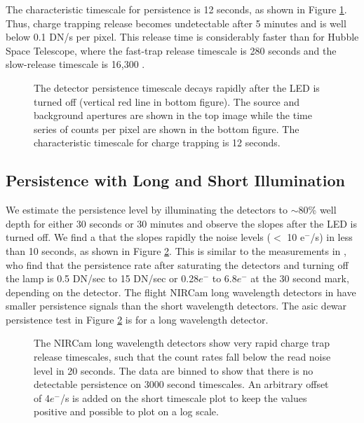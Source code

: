 \documentclass{aastex62}
\begin{document}
The characteristic timescale for persistence is 12 seconds, as shown in Figure \ref{fig:persistence}.
Thus, charge trapping release becomes undetectable after 5 minutes and is well below 0.1 DN/s per pixel.
This release time is considerably faster than for Hubble Space Telescope, where the fast-trap release timescale is 280 seconds and the slow-release timescale is 16,300 \citep{zhou2017chargeTrap}.


\begin{figure}
{}
{}
\caption{The detector persistence timescale decays rapidly after the LED is turned off (vertical red line in bottom figure).
The source and background apertures are shown in the top image while the time series of counts per pixel are shown in the bottom figure.
The characteristic timescale for charge trapping is 12 seconds.}\label{fig:persistence}
\end{figure}


\subsection{Persistence with Long and Short Illumination}
We estimate the persistence level by illuminating the detectors to $\sim$80\% well depth for either 30 seconds or 30 minutes and observe the slopes after the LED is turned off.
We find a that the slopes rapidly the noise levels ($<$ 10 e$^-$/s) in less than 10 seconds, as shown in Figure \ref{fig:persistenceAZlab04}.
This is similar to the measurements in \citet{leisenring2016persistence}, who find that the persistence rate after saturating the detectors and turning off the lamp is 0.5 DN/sec to 15 DN/sec or 0.28$e^-$ to 6.8$e^-$ at the 30 second mark, depending on the detector.
The flight NIRCam long wavelength detectors in \citet{leisenring2016persistence} have smaller persistence signals than the short wavelength detectors.
The asic dewar persistence test in Figure \ref{fig:persistenceAZlab04} is for a long wavelength detector.

\begin{figure}
{}
\caption{The NIRCam long wavelength detectors show very rapid charge trap release timescales, such that the count rates fall below the read noise level in 20 seconds.
The data are binned to show that there is no detectable persistence on 3000 second timescales.
An arbitrary offset of 4$e^-$/s is added on the short timescale plot to keep the values positive and possible to plot on a log scale.}\label{fig:persistenceAZlab04}
\end{figure}
\end{document}
